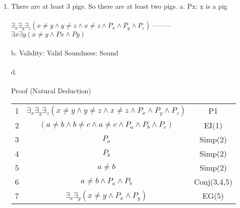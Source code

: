 \documentclass[]{article}
\begin{document}
\begin{enumerate}
    \item There are at least 3 pigs. So there are at least two pigs.
    \newline a.
    \newline Px: x is a pig
    \\\\ $\exists_x \exists_y \exists_z (x\neq y \land y\neq z \land x\neq z \land P_x \land P_y \land P_z)$
    \newline --------
    \newline $\exists x \exists y (x\neq y \land Px \land Py)$
    \\\\b.
    \newline Validity: Valid
    \newline Soundness: Sound
    \\\\d.
    \\\\ Proof (Natural Deduction)
    \begin{tabular}{c| c | c}
        1 & $\exists_x \exists_y \exists_z (x\neq y \land y\neq z \land x\neq z \land P_x \land P_y \land P_z)$ & P1 \\
        2 & $(a\neq b \land b\neq c \land a\neq c\land P_a \land P_b \land P_c)$ & EI(1) \\
        3 & $P_a$ & Simp(2) \\
        4 & $P_b$ & Simp(2) \\
        5 & $a \neq b$ & Simp(2) \\
        6 & $a \neq b \land P_a \land P_b$ & Conj(3,4,5) \\
        7 & $\exists_x \exists_y(x\neq y \land P_x \land P_y)$ & EG(5) \\
    \end{tabular}
    

\end{enumerate}
\end{document}
